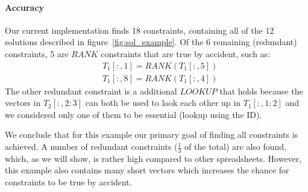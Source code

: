 \documentclass{ecai}
\newcommand{\range}[3]{\ensuremath{#1[#2,#3]}}
\newcommand{\rangeto}[2]{#1{:}#2}
\newcommand{\rangeall}{:}
\newcommand{\ecrank}[2]{\ensuremath{#1 = \mathit{RANK}(#2)}}
\begin{document}
\paragraph{Accuracy}
Our current implementation finds 18 constraints, containing all of the 12 solutions described in figure~\ref{fig:sol_example}.
Of the 6 remaining (redundant) constraints, 5 are $\mathit{RANK}$ constraints that are true by accident, such as: \begin{align*}
  & \ecrank{\range{T_1}{\rangeall}{1}}{\range{T_1}{\rangeall}{5}} \\
  & \ecrank{\range{T_1}{\rangeall}{8}}{\range{T_1}{\rangeall}{4}}
\end{align*}
The other redundant constraint is a additional $\mathit{LOOKUP}$ that holds because the vectors in \range{T_2}{\rangeall}{\rangeto{2}{3}} can both be used to look each other up in \range{T_1}{\rangeall}{\rangeto{1}{2}} and we considered only one of them to be essential (lookup using the ID).

We conclude that for this example our primary goal of finding all constraints is achieved.
A number of redundant constraints ($\frac{1}{3}$ of the total) are also found, which, as we will show, is rather high compared to other spreadsheets.
However, this example also contains many short vectors which increases the chance for constraints to be true by accident.
\end{document}
